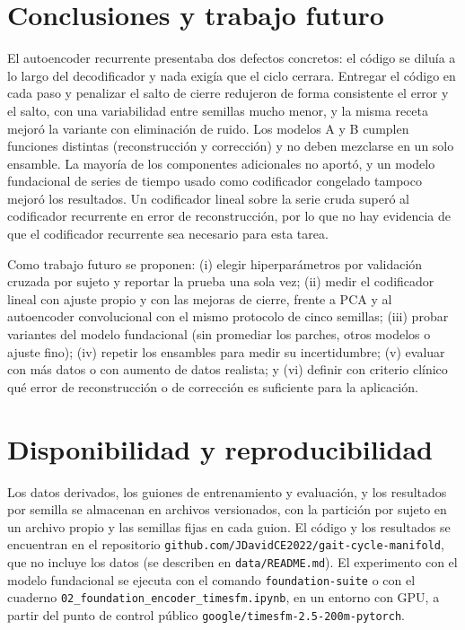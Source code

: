 \documentclass[11pt,a4paper]{amsart}
\begin{document}
\section{Conclusiones y trabajo futuro}
\label{sec:conclusiones}

El autoencoder recurrente presentaba dos defectos concretos: el código se diluía a lo largo del decodificador y nada exigía que el ciclo cerrara. Entregar el código en cada paso y penalizar el salto de cierre redujeron de forma consistente el error y el salto, con una variabilidad entre semillas mucho menor, y la misma receta mejoró la variante con eliminación de ruido. Los modelos A y B cumplen funciones distintas (reconstrucción y corrección) y no deben mezclarse en un solo ensamble. La mayoría de los componentes adicionales no aportó, y un modelo fundacional de series de tiempo usado como codificador congelado tampoco mejoró los resultados. Un codificador lineal sobre la serie cruda superó al codificador recurrente en error de reconstrucción, por lo que no hay evidencia de que el codificador recurrente sea necesario para esta tarea.

Como trabajo futuro se proponen: (i) elegir hiperparámetros por validación cruzada por sujeto y reportar la prueba una sola vez; (ii) medir el codificador lineal con ajuste propio y con las mejoras de cierre, frente a PCA y al autoencoder convolucional con el mismo protocolo de cinco semillas; (iii) probar variantes del modelo fundacional (sin promediar los parches, otros modelos o ajuste fino); (iv) repetir los ensambles para medir su incertidumbre; (v) evaluar con más datos o con aumento de datos realista; y (vi) definir con criterio clínico qué error de reconstrucción o de corrección es suficiente para la aplicación.

\section*{Disponibilidad y reproducibilidad}

Los datos derivados, los guiones de entrenamiento y evaluación, y los resultados por semilla se almacenan en archivos versionados, con la partición por sujeto en un archivo propio y las semillas fijas en cada guion. El código y los resultados se encuentran en el repositorio \texttt{github.com/JDavidCE2022/gait-cycle-manifold}, que no incluye los datos (se describen en \texttt{data/README.md}). El experimento con el modelo fundacional se ejecuta con el comando \texttt{foundation-suite} o con el cuaderno \texttt{02\_foundation\_encoder\_timesfm.ipynb}, en un entorno con GPU, a partir del punto de control público \texttt{google/timesfm-2.5-200m-pytorch}.
\end{document}
